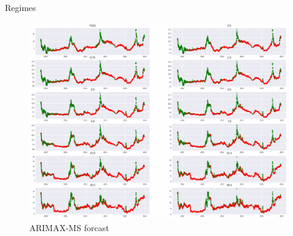 \documentclass[aspectratio=169]{beamer}
\begin{document}
    \begin{frame}{Regimes}
        \begin{figure}
            \includegraphics[scale=0.3]{fig/MSres.png}
            \caption{ARIMAX-MS forcast}
            \label{fig:VARnsfcst}
        \end{figure}
    \end{frame}
\end{document}
